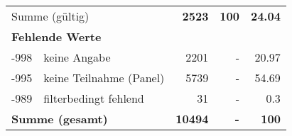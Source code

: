 \begin{longtable}{lXrrr}
     \midrule
     \multicolumn{2}{l}{Summe (gültig)} &
       \textbf{\num{2523}} &
     \textbf{100} &
       \textbf{\num[round-mode=places,round-precision=2]{24,04}} \\
     \multicolumn{5}{l}{\textbf{Fehlende Werte}}\\
       -998 &
       keine Angabe &
         \num{2201} &
        - &
         \num[round-mode=places,round-precision=2]{20,97} \\
       -995 &
       keine Teilnahme (Panel) &
         \num{5739} &
        - &
         \num[round-mode=places,round-precision=2]{54,69} \\
       -989 &
       filterbedingt fehlend &
         \num{31} &
        - &
         \num[round-mode=places,round-precision=2]{0,3} \\
     \midrule
     \multicolumn{2}{l}{\textbf{Summe (gesamt)}} &
          \textbf{\num{10494}} &
        \textbf{-} &
        \textbf{100} \\
     \bottomrule
     \end{longtable}
     
